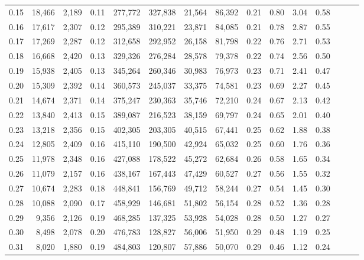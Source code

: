 \begin{tabular}{rrrrrrrrrrrrrrr}
0.15 &  18,466 &  2,189 &  0.11 &  277,772 &  327,838 &   21,564 &   86,392 &  0.21 &  0.80 &  3.04 &      0.58 \\
0.16 &  17,617 &  2,307 &  0.12 &  295,389 &  310,221 &   23,871 &   84,085 &  0.21 &  0.78 &  2.87 &      0.55 \\
0.17 &  17,269 &  2,287 &  0.12 &  312,658 &  292,952 &   26,158 &   81,798 &  0.22 &  0.76 &  2.71 &      0.53 \\
0.18 &  16,668 &  2,420 &  0.13 &  329,326 &  276,284 &   28,578 &   79,378 &  0.22 &  0.74 &  2.56 &      0.50 \\
0.19 &  15,938 &  2,405 &  0.13 &  345,264 &  260,346 &   30,983 &   76,973 &  0.23 &  0.71 &  2.41 &      0.47 \\
0.20 &  15,309 &  2,392 &  0.14 &  360,573 &  245,037 &   33,375 &   74,581 &  0.23 &  0.69 &  2.27 &      0.45 \\
0.21 &  14,674 &  2,371 &  0.14 &  375,247 &  230,363 &   35,746 &   72,210 &  0.24 &  0.67 &  2.13 &      0.42 \\
0.22 &  13,840 &  2,413 &  0.15 &  389,087 &  216,523 &   38,159 &   69,797 &  0.24 &  0.65 &  2.01 &      0.40 \\
0.23 &  13,218 &  2,356 &  0.15 &  402,305 &  203,305 &   40,515 &   67,441 &  0.25 &  0.62 &  1.88 &      0.38 \\
0.24 &  12,805 &  2,409 &  0.16 &  415,110 &  190,500 &   42,924 &   65,032 &  0.25 &  0.60 &  1.76 &      0.36 \\
0.25 &  11,978 &  2,348 &  0.16 &  427,088 &  178,522 &   45,272 &   62,684 &  0.26 &  0.58 &  1.65 &      0.34 \\
0.26 &  11,079 &  2,157 &  0.16 &  438,167 &  167,443 &   47,429 &   60,527 &  0.27 &  0.56 &  1.55 &      0.32 \\
0.27 &  10,674 &  2,283 &  0.18 &  448,841 &  156,769 &   49,712 &   58,244 &  0.27 &  0.54 &  1.45 &      0.30 \\
0.28 &  10,088 &  2,090 &  0.17 &  458,929 &  146,681 &   51,802 &   56,154 &  0.28 &  0.52 &  1.36 &      0.28 \\
0.29 &   9,356 &  2,126 &  0.19 &  468,285 &  137,325 &   53,928 &   54,028 &  0.28 &  0.50 &  1.27 &      0.27 \\
0.30 &   8,498 &  2,078 &  0.20 &  476,783 &  128,827 &   56,006 &   51,950 &  0.29 &  0.48 &  1.19 &      0.25 \\
0.31 &   8,020 &  1,880 &  0.19 &  484,803 &  120,807 &   57,886 &   50,070 &  0.29 &  0.46 &  1.12 &      0.24 \\

\end{tabular}
